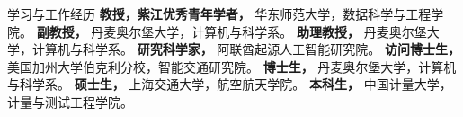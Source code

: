 \begin{rubric}{学习与工作经历}
%
	\textbf{教授，紫江优秀青年学者，} 华东师范大学，数据科学与工程学院。
\entry*[2022 -- 2023]%
	\textbf{副教授，} 丹麦奥尔堡大学，计算机与科学系。
\entry*[2020 -- 2022]%
	\textbf{助理教授，} 丹麦奥尔堡大学，计算机与科学系。
\entry*[2019 -- 2020]%
	\textbf{研究科学家，} 阿联酋起源人工智能研究院。
\entry*[2017 -- 2018]%
	\textbf{访问博士生，} 美国加州大学伯克利分校，智能交通研究院。
\entry*[2015 -- 2019]%
	\textbf{博士生，} 丹麦奥尔堡大学，计算机与科学系。
\entry*[2011 -- 2014]%
        \textbf{硕士生，} 上海交通大学，航空航天学院。
\entry*[2007 -- 2011]%
        \textbf{本科生，} 中国计量大学，计量与测试工程学院。
\end{rubric}
